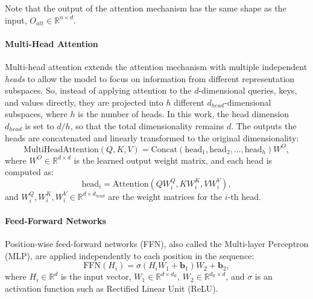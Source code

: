 Note that the output of the attention mechanism has the same shape as the input, $O_{att} \in \mathbb{R}^{n \times d}$.

\paragraph{Multi-Head Attention}
Multi-head attention extends the attention mechanism with multiple independent \emph{heads} to allow the model to focus on information from different representation subspaces. So, instead of applying attention to the $d$-dimensional queries, keys, and values directly, they are projected into $h$ different $d_{head}$-dimensional subspaces, where $h$ is the number of heads. In this work, the head dimension $d_{head}$ is set to $d/h$, so that the total dimensionality remains $d$. The outputs the heads are concatenated and linearly transformed to the original dimensionality:
\begin{equation*}
    \text{MultiHeadAttention}(Q, K, V) = \text{Concat}(\text{head}_1, \text{head}_2, \dots, \text{head}_h) W^O,
\end{equation*}
where $W^O \in \mathbb{R}^{d \times d}$ is the learned output weight matrix, and each head is computed as:
\begin{equation*}
    \text{head}_i = \text{Attention}(Q W_i^Q, K W_i^K, V W_i^V),
\end{equation*}
and $W_i^Q, W_i^K, W_i^V \in \mathbb{R}^{d \times d_{head}}$ are the weight matrices for the $i$-th head.

\paragraph{Feed-Forward Networks}

Position-wise feed-forward networks (FFN), also called the Multi-layer Perceptron (MLP), are applied independently to each position in the sequence:
\begin{equation*}
    \text{FFN}(H_i) = \sigma(H_i W_1 + \mathbf{b}_1) W_2 + \mathbf{b}_2,
\end{equation*}
where $H_i \in \mathbb{R}^d$ is the input vector, $W_1 \in \mathbb{R}^{d \times d_{\text{ff}}}$, $W_2 \in \mathbb{R}^{d_{\text{ff}} \times d}$, and $\sigma$ is an activation function such as Rectified Linear Unit (ReLU).

